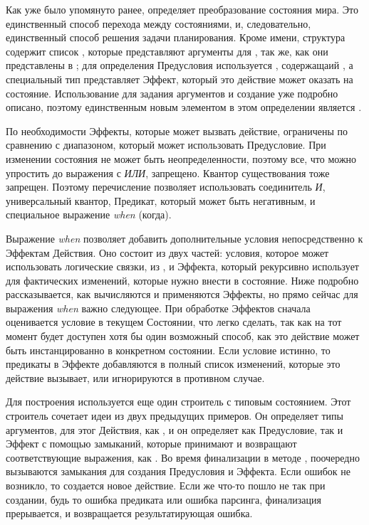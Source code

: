 Как уже было упомянуто ранее,
 определяет преобразование состояния мира.
Это единственный способ перехода между состояниями,
и, следовательно, единственный способ решения задачи планирования.
Кроме имени, структура  содержит
список , которые представляют аргументы для ,
так же, как они представлены в ;
для определения Предусловия используется , содержащаий ,
а специальный тип  представляет Эффект,
который это действие может оказать на состояние.
Использование  для задания аргументов
и создание  уже подробно описано,
поэтому единственным новым элементом в этом определении является .

По необходимости Эффекты, которые может вызвать действие, ограничены
по сравнению с диапазоном, который может использовать Предусловие.
При изменении состояния не может быть неопределенности,
поэтому все, что можно упростить до выражения с \textit{ИЛИ},
запрещено. Квантор существования тоже запрещен.
Поэтому перечисление  позволяет использовать
соединитель \textit{И}, универсальный квантор, Предикат,
который может быть негативным, и специальное выражение \textit{when} (когда).

Выражение \textit{when} позволяет добавить дополнительные условия
непосредственно к Эффектам Действия.
Оно состоит из двух частей:
условия, которое может использовать логические связки,
из ,
и Эффекта, который рекурсивно использует  для фактических
изменений, которые нужно внести в состояние.
Ниже подробно рассказывается, как вычисляются и применяются Эффекты,
но прямо сейчас для выражения \textit{when} важно следующее.
При обработке Эффектов сначала оценивается условие
в текущем Состоянии, что легко сделать, так как на тот момент будет доступен
хотя бы один возможный способ, как это действие может быть инстанцированно в конкретном состоянии.
Если условие истинно, то предикаты в Эффекте
добавляются в полный список изменений, которые это действие вызывает,
или игнорируются в противном случае.

Для построения  используется еще один строитель с типовым состоянием.
Этот строитель сочетает идеи из двух предыдущих примеров.
Он определяет типы аргументов, для этог Действия, как ,
и он определяет как Предусловие, так и Эффект с помощью замыканий,
которые принимают  и возвращают соответствующие выражения,
как .
Во время финализации в методе ,
поочередно вызываются замыкания для создания Предусловия и Эффекта.
Если ошибок не возникло, то создается новое действие.
Если же что-то пошло не так при создании,
будь то ошибка предиката или ошибка парсинга,
финализация прерывается, и возвращается результатирующая ошибка.

